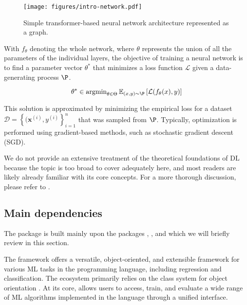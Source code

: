 \documentclass[article]{jss}
\theoremstyle{definition}
\begin{document}
\begin{figure}[h]
    \centering
    \texttt{[image: figures/intro-network.pdf]}
    \caption{Simple transformer-based neural network architecture represented as a graph.}
    \label{fig:intro-network}
\end{figure}

With $f_\theta$ denoting the whole network, where $\theta$ represents the union of all the parameters of the individual layers, the objective of training a neural network is to find a parameter vector $\theta^*$ that minimizes a loss function $\mathcal{L}$ given a data-generating process $\P$.

\begin{equation}
\theta^* \in \operatorname{argmin}_{\theta \in \Theta} \mathbb{E}_{(x, y) \sim \P} \left[ \mathcal{L}(f_{\theta}(x), y) \right]
\end{equation}

This solution is approximated by minimizing the empirical loss for a dataset $\mathcal{D} = \left\{ (\mathbf{x}^{(i)}, y^{(i)} \right\}_{i=1}^n$ that was sampled from $\P$.
Typically, optimization is performed using gradient-based methods, such as stochastic gradient descent (SGD).

We do not provide an extensive treatment of the theoretical foundations of DL because the topic is too broad to cover adequately here, and most readers are likely already familiar with its core concepts. For a more thorough discussion, please refer to \cite{bishop2023deep}.

\subsection{Main dependencies}

The  \rlang{} package is built mainly upon the \rlang{} packages  \citep{ref-mlr32019},  \citep{ref-mlr3pipelines2021}, and  \citep{ref-torch2025} which we will briefly review in this section.

The  framework offers a versatile, object-oriented, and extensible framework for various ML tasks in the \rlang{} programming language, including regression and classification.
The ecosystem primarily relies on the  class system for object orientation \citep{ref-r6chang}.
At its core,  allows users to access, train, and evaluate a wide range of ML algorithms implemented in the \rlang{} language through a unified interface.
\end{document}
